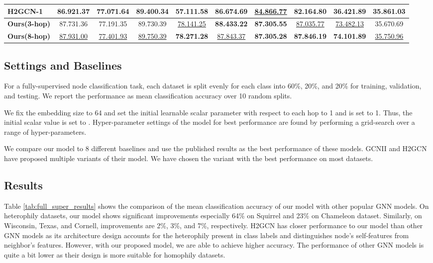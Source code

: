 \documentclass[sigconf,natbib=false]{acmart}
\begin{document}
\begin{table*}
{\begin{tabular}{lccccccccc}
\textbf{H2GCN-1}     & 86.921.37         & 77.071.64         & 89.400.34         & 57.111.58          & 86.674.69          & \uline{84.866.77}  & 82.164.80          & 36.421.89          & \textbf{35.861.03}  \\ 
\hline
\textbf{Ours(3-hop)} & 87.731.36         & 77.191.35         & 89.730.39         & \uline{78.141.25}  & \textbf{88.433.22} & \textbf{87.305.55} & \uline{87.035.77}  & \uline{73.482.13}  & 35.670.69           \\
\textbf{Ours(8-hop)} & \uline{87.931.00} & \uline{77.401.93} & \uline{89.750.39} & \textbf{78.271.28} & \uline{87.843.37}  & \textbf{87.305.28} & \textbf{87.846.19} & \textbf{74.101.89} & \uline{35.750.96}   \\
\bottomrule
\end{tabular}
}
\end{table*}




\subsection{Settings and Baselines}

For a fully-supervised node classification task, each dataset is split evenly for each class into 60\%, 20\%, and 20\% for training, validation, and testing. We report the performance as mean classification accuracy over 10 random splits.

We fix the embedding size to 64 and set the initial learnable scalar parameter with respect to each hop to 1 and  is set to 1. Thus, the initial scalar value  is set to . Hyper-parameter settings of the model for best performance are found by performing a grid-search over a range of hyper-parameters. 


We compare our model to 8 different baselines and use the published results as the best performance of these models. GCNII \cite{chen_simple_2020} and H2GCN \cite{zhu_beyond_2020} have proposed multiple variants of their model. We have chosen the variant with the best performance on most datasets. 

\subsection{Results}
Table \ref{tab:full_super_results} shows the comparison of the mean classification accuracy of our model with other popular GNN models. On heterophily datasets, our model shows significant improvements especially 64\% on Squirrel and 23\% on Chameleon dataset. Similarly, on Wisconsin, Texas, and Cornell, improvements are 2\%, 3\%, and 7\%, respectively. H2GCN has closer performance to our model than other GNN models as its architecture design accounts for the heterophily present in class labels and distinguishes node's self-features from neighbor's features. However, with our proposed model, we are able to achieve higher accuracy. The performance of other GNN models is quite a bit lower as their design is more suitable for homophily datasets.
\end{document}
